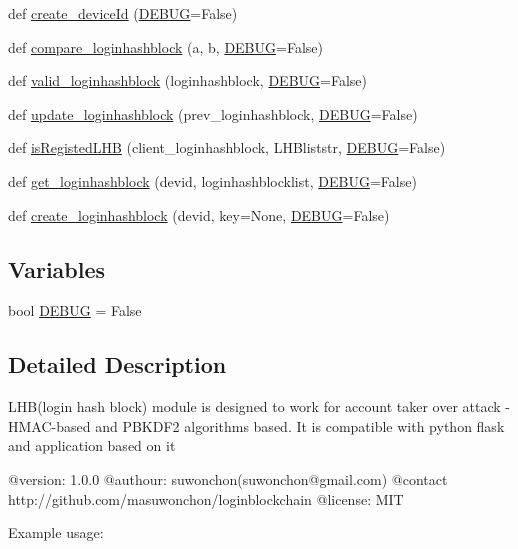 \begin{DoxyCompactItemize}
\item 
def \hyperlink{namespaceloginhashblock_a1bd31fe2f0ea4e6673127d72b6c42826}{create\+\_\+device\+Id} (\hyperlink{namespaceloginhashblock_ad198a2ffc3d7bab32167aed00d2f5c65}{D\+E\+B\+UG}=False)
\item 
def \hyperlink{namespaceloginhashblock_ac24dd842eb90e0ede55e842d44148d5b}{compare\+\_\+loginhashblock} (a, b, \hyperlink{namespaceloginhashblock_ad198a2ffc3d7bab32167aed00d2f5c65}{D\+E\+B\+UG}=False)
\item 
def \hyperlink{namespaceloginhashblock_ac120dd8384bd51c357e2ad5f6cb2f99a}{valid\+\_\+loginhashblock} (loginhashblock, \hyperlink{namespaceloginhashblock_ad198a2ffc3d7bab32167aed00d2f5c65}{D\+E\+B\+UG}=False)
\item 
def \hyperlink{namespaceloginhashblock_ab6bafe3dab103cc698822367e53d4a64}{update\+\_\+loginhashblock} (prev\+\_\+loginhashblock, \hyperlink{namespaceloginhashblock_ad198a2ffc3d7bab32167aed00d2f5c65}{D\+E\+B\+UG}=False)
\item 
def \hyperlink{namespaceloginhashblock_a978cb4557443cefddac883f3d92ad8e1}{is\+Registed\+L\+HB} (client\+\_\+loginhashblock, L\+H\+Bliststr, \hyperlink{namespaceloginhashblock_ad198a2ffc3d7bab32167aed00d2f5c65}{D\+E\+B\+UG}=False)
\item 
def \hyperlink{namespaceloginhashblock_ab2ceb1d30aad9af290ac7d44e9f95bf2}{get\+\_\+loginhashblock} (devid, loginhashblocklist, \hyperlink{namespaceloginhashblock_ad198a2ffc3d7bab32167aed00d2f5c65}{D\+E\+B\+UG}=False)
\item 
def \hyperlink{namespaceloginhashblock_ad3ef8dab740c69ca8424797f9c146a53}{create\+\_\+loginhashblock} (devid, key=None, \hyperlink{namespaceloginhashblock_ad198a2ffc3d7bab32167aed00d2f5c65}{D\+E\+B\+UG}=False)
\end{DoxyCompactItemize}
\subsection*{Variables}
\begin{DoxyCompactItemize}
\item 
bool \hyperlink{namespaceloginhashblock_ad198a2ffc3d7bab32167aed00d2f5c65}{D\+E\+B\+UG} = False
\end{DoxyCompactItemize}


\subsection{Detailed Description}
\begin{DoxyVerb}LHB(login hash block) module is designed to work for account taker over attack - HMAC-based and PBKDF2 algorithms based.
It is compatible with python flask and application based on it

@version: 1.0.0
@authour: suwonchon(suwonchon@gmail.com)
@contact http://github.com/masuwonchon/loginblockchain
@license: MIT

Example usage:\end{DoxyVerb}
 

